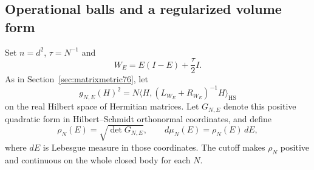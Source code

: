 \subsection{Operational balls and a regularized volume form}
Set $n=d^2$, $\tau=N^{-1}$ and
\[
 W_E=E(I-E)+\frac\tau2 I.
\]
As in Section~\ref{sec:matrixmetric76}, let
\begin{equation}\label{eq:matrixfixedform76}
 g_{N,E}(H)^2
 =N\langle H,(L_{W_E}+R_{W_E})^{-1}H\rangle_{\mathrm{HS}}
\end{equation}
on the real Hilbert space of Hermitian matrices. Let $G_{N,E}$ denote
this positive quadratic form in Hilbert--Schmidt orthonormal
coordinates, and define
\begin{equation}\label{eq:matrixmeasure76}
 \rho_N(E)=\sqrt{\det G_{N,E}},\qquad
 d\mu_N(E)=\rho_N(E)\,dE,
\end{equation}
where $dE$ is Lebesgue measure in those coordinates. The cutoff makes
$\rho_N$ positive and continuous on the whole closed body for each
$N$.

